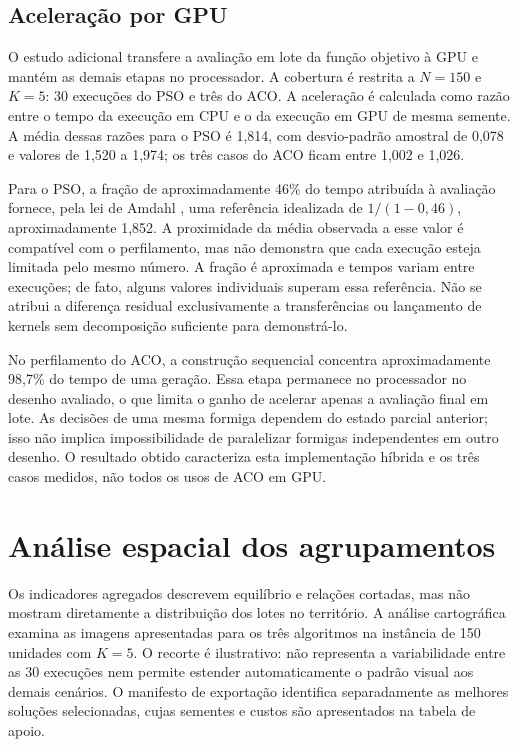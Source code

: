 \documentclass[12pt,a4paper]{article}
\begin{document}
\subsection{Aceleração por GPU}
\label{subsec:gpu}

O estudo adicional transfere a avaliação em lote da função objetivo à GPU e mantém as
demais etapas no processador. A cobertura é restrita a $N=150$ e $K=5$: 30 execuções do
PSO e três do ACO. A aceleração é calculada como razão entre o tempo da execução em CPU
e o da execução em GPU de mesma semente. A média dessas razões para o PSO é 1,814, com
desvio-padrão amostral de 0,078 e valores de 1,520 a 1,974; os três casos do ACO ficam
entre 1,002 e 1,026.

Para o PSO, a fração de aproximadamente 46\% do tempo atribuída à avaliação fornece,
pela lei de Amdahl \cite{amdahl1967}, uma referência idealizada de $1/(1-0{,}46)$, aproximadamente 1,852. A
proximidade da média observada a esse valor é compatível com o perfilamento, mas não
demonstra que cada execução esteja limitada pelo mesmo número. A fração é aproximada e
tempos variam entre execuções; de fato, alguns valores individuais superam essa
referência. Não se atribui a diferença residual exclusivamente a transferências ou
lançamento de kernels sem decomposição suficiente para demonstrá-lo.

No perfilamento do ACO, a construção sequencial concentra aproximadamente 98,7\% do
tempo de uma geração. Essa etapa permanece no processador no desenho avaliado, o que
limita o ganho de acelerar apenas a avaliação final em lote. As decisões de uma mesma
formiga dependem do estado parcial anterior; isso não implica impossibilidade de
paralelizar formigas independentes em outro desenho. O resultado obtido caracteriza esta
implementação híbrida e os três casos medidos, não todos os usos de ACO em GPU.

\section{Análise espacial dos agrupamentos}
\label{sec:analise-espacial}

Os indicadores agregados descrevem equilíbrio e relações cortadas, mas não mostram
diretamente a distribuição dos lotes no território. A análise cartográfica examina as
imagens apresentadas para os três algoritmos na instância de 150 unidades com $K=5$. O
recorte é ilustrativo: não representa a variabilidade entre as 30 execuções nem permite
estender automaticamente o padrão visual aos demais cenários. O manifesto de exportação
identifica separadamente as melhores soluções selecionadas, cujas sementes e custos são
apresentados na tabela de apoio.
\end{document}
